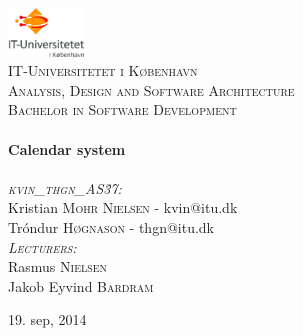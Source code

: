 \begin{titlepage}
\begin{center}

\includegraphics[width=0.15\textwidth]{./logo}~\\[1cm]

\textsc{\LARGE IT-Universitetet i København}\\[1.5cm]

\textsc{\Large Analysis, Design and Software Architecture}\\[0.5cm]
\textsc{Bachelor in Software Development}\\[0.5cm]

\HRule \\[0.4cm]
{ \huge \bfseries Calendar system \\[0.4cm] }
\HRule \\[1.5cm]

\textsc{\LARGE \emph{kvin\_thgn\_AS\.37:}}\\
\vspace{2 mm}
\large
Kristian \textsc{Mohr Nielsen} - kvin@itu.dk\\
Tróndur \textsc{Høgnason} - thgn@itu.dk\\
\vspace{10 mm}
\large
\textsc{\large \emph{Lecturers:}}\\
\vspace{1 mm}
Rasmus \textsc{Nielsen} \\
Jakob Eyvind \textsc{Bardram}

\vfill

{\large 19. sep, 2014}
\end{center}
\end{titlepage}
